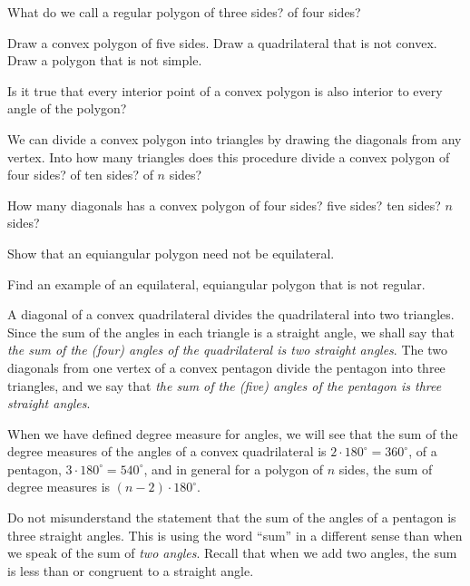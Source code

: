 \documentclass[11pt]{book}
\theoremstyle{bkplain}
\theoremstyle{XIplainnote}
\theoremstyle{bkplain}
\theoremstyle{bkplain}
\begin{document}
\begin{exercisecols}
\begin{exlist}
\item What do we call a regular polygon of three sides? of four sides?
\item Draw a convex polygon of five sides. Draw a quadrilateral that is not
  convex. Draw a polygon that is not simple.
\item[\stex 3.] Is it true that every interior point of a convex polygon is
  also interior to every angle of the polygon?
\item[4.] We can divide a convex polygon into triangles by drawing the
  diagonals from any vertex. Into how many triangles does this procedure
  divide a convex polygon of four sides? of ten sides? of $n$ sides?
\item[\stex 5.] How many diagonals has a convex polygon of four sides? five
  sides? ten sides? $n$ sides?
\item[6.] Show that an equiangular polygon need not be equilateral.
\item[\stex 7.] Find an example of an equilateral, equiangular polygon that is
  not regular.
\end{exlist}
\end{exercisecols}

A diagonal of a convex quadrilateral divides the quadrilateral into two
triangles. Since the sum of the angles in each triangle is a straight angle,
we shall say that \emph{the sum of the (four) angles of the quadrilateral is
two straight angles}. The two diagonals from one vertex of a convex pentagon
divide the pentagon into three triangles, and we say that \emph{the sum of the
(five) angles of the pentagon is three straight angles}.

When we have defined degree measure for angles, we will see that the sum of
the degree measures of the angles of a convex quadrilateral is
$2 \cdot 180^\circ = 360^\circ$, of a pentagon,
$3 \cdot 180^\circ = 540^\circ$, and in general for a polygon of $n$ sides,
the sum of degree measures is $(n - 2) \cdot 180^\circ$.

Do not misunderstand the statement that the sum of the angles of a pentagon is
three straight angles. This is using the word ``sum'' in a different sense
than when we speak of the sum of \emph{two angles}. Recall that when we add
two angles, the sum is less than or congruent to a straight angle.

\FIGVIIITWENTYTWOTHREE
\end{document}
